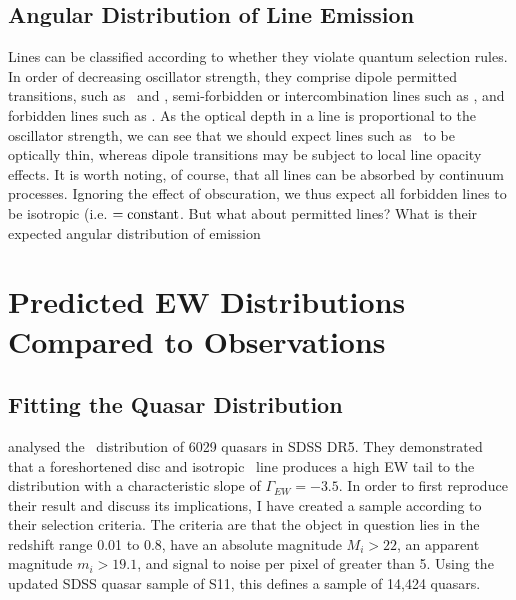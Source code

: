 



\subsection{Angular Distribution of Line Emission}

Lines can be classified according to whether they violate quantum selection rules.
In order of decreasing oscillator strength, they comprise
dipole permitted transitions, such as \civline\ and \hb, 
semi-forbidden or intercombination
lines such as \ciiiline, and forbidden lines such as \oiiifull.
As the optical depth in a line is proportional to the oscillator strength,
we can see that we should expect lines such as \oiiifull\ to be optically
thin, whereas dipole transitions may be subject to local line
opacity effects. It is worth noting, of course, that all lines can be absorbed by 
continuum processes. Ignoring the effect of obscuration, we thus expect all 
forbidden lines to be isotropic (i.e. \eptl$={\rm constant}$. 
But what about permitted lines? What is their expected angular distribution
of emission





\section{Predicted EW Distributions Compared to Observations}
\label{sec:mc_angular}

\subsection{Fitting the Quasar Distribution}
\label{sec:fitting}

\citet[][hereafter R11]{risaliti2011} analysed the \ewo\ 
distribution of 6029 quasars in SDSS DR5. They demonstrated
that a foreshortened disc and isotropic \oiiifull\ line produces
a high EW tail to the distribution with a characteristic 
slope of $\Gamma_{EW}=-3.5$. In order to first reproduce their
result and discuss its implications, I have 
created a sample according to their selection
criteria. The criteria are that the object in question lies in the redshift
range 0.01 to 0.8, have an absolute magnitude $M_i>22$, an 
apparent magnitude $m_i>19.1$, and signal to noise per pixel of greater
than 5. Using the updated SDSS quasar sample of S11, this defines
a sample of 14,424 quasars.


